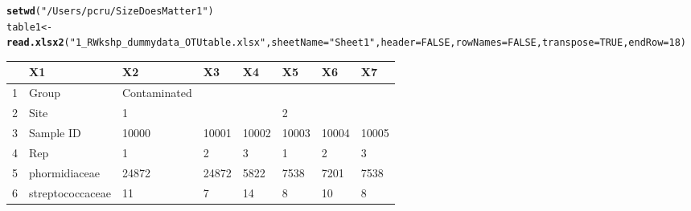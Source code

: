 \documentclass[12pt]{beamer}\usepackage[]{graphicx}\usepackage[]{color}
\makeatletter
\newcommand{\hlnum}[1]{\textcolor[rgb]{0.686,0.059,0.569}{#1}}%
\newcommand{\hlstr}[1]{\textcolor[rgb]{0.192,0.494,0.8}{#1}}%
\newcommand{\hlstd}[1]{\textcolor[rgb]{0.345,0.345,0.345}{#1}}%
\newcommand{\hlkwb}[1]{\textcolor[rgb]{0.69,0.353,0.396}{#1}}%
\newcommand{\hlkwc}[1]{\textcolor[rgb]{0.333,0.667,0.333}{#1}}%
\newcommand{\hlkwd}[1]{\textcolor[rgb]{0.737,0.353,0.396}{\textbf{#1}}}%
\newenvironment{kframe}{%
 \def\at@end@of@kframe{}%
 \ifinner\ifhmode%
  \def\at@end@of@kframe{\end{minipage}}%
  \begin{minipage}{\columnwidth}%
 \fi\fi%
 \def\FrameCommand##1{\hskip\@totalleftmargin \hskip-\fboxsep
 \colorbox{shadecolor}{##1}\hskip-\fboxsep
     \hskip-\linewidth \hskip-\@totalleftmargin \hskip\columnwidth}%
 \MakeFramed {\advance\hsize-\width
   \@totalleftmargin\z@ \linewidth\hsize
   \@setminipage}}%
 {\par\unskip\endMakeFramed%
 \at@end@of@kframe}
\newenvironment{knitrout}{}{} %
\makeatother
\begin{document}
\begin{frame}
\begin{knitrout}
\begin{kframe}
{\ttfamily\noindent\itshape\color{messagecolor}{\#\# Loading required package: methods\\\#\# Loading required package: xlsxjars\\\#\# Loading required package: xtable}}\end{kframe}
\end{knitrout}
\begin{knitrout}
\color{fgcolor}\begin{kframe}
\begin{alltt}
\hlkwd{setwd}\hlstd{(}\hlstr{"/Users/pcru/SizeDoesMatter1"}\hlstd{)}
\hlstd{table1}\hlkwb{<-}\hlkwd{read.xlsx2}\hlstd{(}\hlstr{"1_R Wkshp_dummy data_OTU table.xlsx"}\hlstd{,} \hlkwc{sheetName} \hlstd{=} \hlstr{"Sheet1"}\hlstd{,}\hlkwc{header}\hlstd{=}\hlnum{FALSE}\hlstd{,}\hlkwc{rowNames}\hlstd{=}\hlnum{FALSE}\hlstd{,}\hlkwc{transpose}\hlstd{=}\hlnum{TRUE}\hlstd{,}\hlkwc{endRow}\hlstd{=}\hlnum{18}\hlstd{)}
\end{alltt}
\end{kframe}
\end{knitrout}
\begin{table}[ht]
\centering
\begin{tabular}{rlllllll}
  \hline
 & X1 & X2 & X3 & X4 & X5 & X6 & X7 \\ 
  \hline
1 & Group & Contaminated &  &  &  &  &  \\ 
  2 & Site & 1 &  &  & 2 &  &  \\ 
  3 & Sample ID & 10000 & 10001 & 10002 & 10003 & 10004 & 10005 \\ 
  4 & Rep & 1 & 2 & 3 & 1 & 2 & 3 \\ 
  5 & phormidiaceae & 24872 & 24872 & 5822 & 7538 & 7201 & 7538 \\ 
  6 & streptococcaceae & 11 & 7 & 14 & 8 & 10 & 8 \\ 
   \hline
\end{tabular}
\end{table}

\clearpage
\end{frame}
\end{document}
